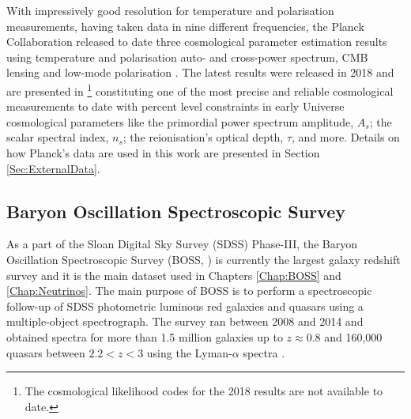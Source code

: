 \qquad With impressively good resolution for temperature and polarisation measurements, having taken data in nine different frequencies, the Planck Collaboration released to date three cosmological parameter estimation results using temperature and polarisation auto- and cross-power spectrum, CMB lensing and low-mode polarisation \citep{planck2013,PlanckCosmology2016,2018PlanckCosmology}. The latest results were released in 2018 and are presented in \cite{2018PlanckCosmology} \footnote{The cosmological likelihood codes for the 2018 results are not available to date.} constituting one of the most precise and reliable cosmological measurements to date with percent level constraints in early Universe cosmological parameters like the primordial power spectrum amplitude, $A_s$; the scalar spectral index, $n_s$; the reionisation's optical depth, $\tau$, and more. Details on how Planck's data are used in this work are presented in Section \ref{Sec:ExternalData}.


\subsection{Baryon Oscillation Spectroscopic Survey}
As a part of the Sloan Digital Sky Survey (SDSS) Phase-III, the Baryon Oscillation Spectroscopic Survey (BOSS, \citealt{2013BOSS-Whitepaper}) is currently the largest galaxy redshift survey and it is the main dataset used in Chapters \ref{Chap:BOSS} and \ref{Chap:Neutrinos}. The main purpose of BOSS is to perform a spectroscopic follow-up of SDSS photometric luminous red galaxies and quasars using a multiple-object spectrograph. The survey ran between 2008 and 2014 and obtained spectra for more than 1.5 million galaxies up to $z\approx 0.8$ \citep{BOSSCatalogue2016} and 160,000 quasars between $2.2 < z < 3$ using the Lyman-$\alpha$ spectra \citep{2013LyAlphaBOSS}.

